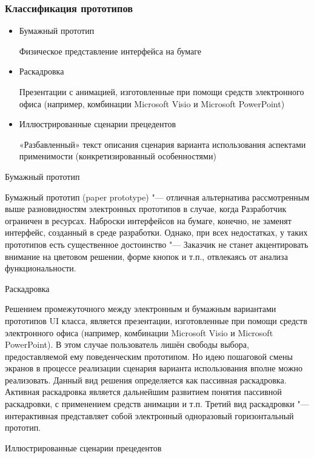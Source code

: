 \documentclass{../industrial-development}
\begin{document}
{\begin{frame} \frametitle {Классификация прототипов}
\begin{itemize}
\item Бумажный прототип

{\small Физическое представление интерфейса на бумаге}

\item Раскадровка

{\small Презентации с анимацией, изготовленные при помощи средств электронного офиса (например, комбинации Microsoft Visio и Microsoft PowerPoint)}

\item Иллюстрированные сценарии прецедентов

{\small «Разбавленный» текст описания сценария варианта
использования аспектами применимости (конкретизированный особенностями)}

\end{itemize}
\end{frame}

\lecturenotes

\alert{Бумажный прототип}

Бумажный прототип (paper prototype) "--- отличная альтернатива рассмотренным выше разновидностям электронных прототипов в случае, когда Разработчик ограничен в ресурсах. Наброски интерфейсов на бумаге, конечно, не заменят интерфейс, созданный в среде разработки. Однако, при всех недостатках, у таких прототипов есть существенное достоинство "--- Заказчик не станет акцентировать внимание на цветовом решении, форме кнопок и т.п., отвлекаясь от анализа функциональности.

\alert{Раскадровка}

Решением промежуточного между электронным и бумажным вариантами
прототипов UI класса, является презентации, изготовленные при помощи средств электронного офиса (например, комбинации Microsoft Visio и Microsoft PowerPoint). В этом случае пользователь лишён свободы выбора, предоставляемой ему поведенческим прототипом. Но идею пошаговой смены экранов в процессе реализации сценария варианта
использования вполне можно реализовать. Данный вид решения определяется как пассивная раскадровка. Активная раскадровка является дальнейшим развитием понятия пассивной раскадровки, с применением средств анимации и т.п. Третий вид раскадровки "--- интерактивная представляет собой электронный одноразовый
горизонтальный прототип.


\alert{Иллюстрированные сценарии прецедентов}

}
\end{document}

